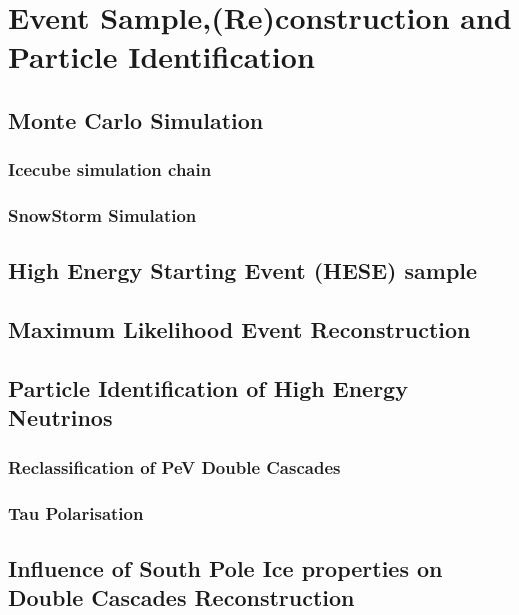 \setchapterpreamble[u]{\margintoc}
\chapter{Event Sample,(Re)construction and Particle Identification}

\section{Monte Carlo Simulation} 
\label{sec:mc_sim}

\subsection{Icecube simulation chain}
\label{sec:sim_ic}

\subsection{SnowStorm Simulation}
\label{sec:snowstorm}

\section{High Energy Starting Event (HESE) sample} 
\label{sec:HESE}

\section{Maximum Likelihood Event Reconstruction}
\label{sec:reco}

\section{Particle Identification of High Energy Neutrinos}
\label{sec:PID}

\subsection{Reclassification of PeV Double Cascades}
\label{sec:Pev_mask}

\subsection{Tau Polarisation}
\label{sec:Pev_mask}

\section{Influence of South Pole Ice properties on Double Cascades Reconstruction}
\label{sec:icemodel_checks}

